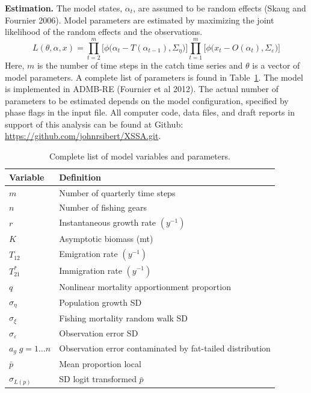 \documentclass[12pt,letterpaper,twoside]{article}
\begin{document}
{\bf Estimation.} The model states, $\alpha_t$, are assumed to be random
effects (Skaug and Fournier 2006). Model parameters are estimated by
maximizing the joint likelihood of the random
effects and the observations.
\begin{equation}
L(\theta,\alpha,x)=
\prod^m_{t=2}\big[\phi\big(\alpha_t-T(\alpha_{t-1}), \Sigma_\eta\big)\big]
\prod^m_{t=1}\big[\phi\big(x_t-O(\alpha_t), \Sigma_\varepsilon\big)\big]
\end{equation}
Here, $m$ is the number of time steps in the catch time series and
$\theta$ is a vector of model parameters. A complete list of
parameters is found in Table~\ref{tab:allvars}. 
The model is implemented in ADMB-RE (Fournier et al 2012).
The actual number of
parameters to be estimated depends on the model configuration,
specified by phase flags in the input file. 
All computer code, data files, and draft reports in support of this
analysis can be found at Github:\linebreak
\url{https://github.com/johnrsibert/XSSA.git}.


\begin{table}
\caption{Complete list of model variables and parameters.
\label{tab:allvars}}
\begin{center}
\begin{tabular}{ll}
\hline
Variable & Definition\\
\hline
\hline
$m$ & Number of quarterly time steps\\
$n$ & Number of fishing gears\\
\hline
\hline
$r$ & Instantaneous growth rate $(y^{-1})$\\
$K$ & Asymptotic biomass (mt) \\
$T_{12}$ & Emigration rate $(y^{-1})$\\
$T^*_{21}$& Immigration rate $(y^{-1})$\\
$q$ & Nonlinear mortality apportionment proportion\\
\hline
$\sigma_\eta$ & Population growth SD\\
$\sigma_\xi$ & Fishing mortality random walk SD\\
$\sigma_\varepsilon$ & Observation error SD \\
$a_g\; g=1\ldots n$ & Observation error contaminated by 
fat-tailed distribution\\
\hline
$\bar{p}$ & Mean proportion local\\
$\sigma_{L(p)}$ & SD logit transformed $\bar{p}$\\
\hline
\end{tabular}
\end{center}
\end{table}

\clearpage

\end{document}
